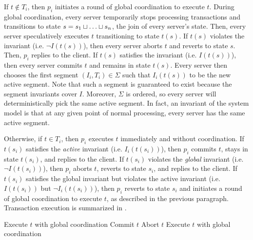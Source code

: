 If $t \notin T_i$, then $p_i$ initiates a round of global coordination to
execute $t$. During global coordination, every server temporarily stops
processing transactions and transitions to state $s = s_1 \sqcup \ldots \sqcup
s_n$, the join of every server's state. Then, every server speculatively
executes $t$ transitioning to state $t(s)$. If $t(s)$ violates the invariant
(i.e.  $\lnot I(t(s))$), then every server aborts $t$ and reverts to state $s$.
Then, $p_i$ replies to the client. If $t(s)$ satisfies the invariant (i.e.
$I(t(s))$), then every server commits $t$ and remains in state $t(s)$. Every
server then chooses the first segment $(I_i, T_i) \in \Sigma$ such that
$I_i(t(s))$ to be the new active segment.  Note that such a segment is
guaranteed to exist because the segment invariants cover $I$. Moreover,
$\Sigma$ is ordered, so every server will deterministically pick the same
active segment. In fact, an invariant of the system model is that at any given
point of normal processing, every server has the same active segment.

Otherwise, if $t \in T_i$, then $p_i$ executes $t$ immediately and without
coordination.  If $t(s_i)$ satisfies the \emph{active} invariant (i.e.
$I_i(t(s_i))$), then $p_i$ commits $t$, stays in state $t(s_i)$, and replies to
the client. If $t(s_i)$ violates the \emph{global} invariant (i.e. $\lnot
I(t(s_i))$), then $p_i$ aborts $t$, reverts to state $s_i$, and replies to the
client. If $t(s_i)$ satisfies the global invariant but violates the active
invariant (i.e.  $I(t(s_i))$ but $\lnot I_i(t(s_i))$), then $p_i$ reverts to
state $s_i$ and initiates a round of global coordination to execute $t$, as
described in the previous paragraph.  Transaction execution is summarized in
.

\begin{algorithm}[t]
  \caption{%
    Transaction execution in the segmented \invariantconfluence{} system model}%
  \begin{algorithmic}
      \State Execute $t$ with global coordination
    \Else{}
        \State Commit $t$
        \State Abort $t$
      \Else{}
        \State Execute $t$ with global coordination
      \EndIf{}
    \EndIf{}
  \end{algorithmic}
\end{algorithm}


